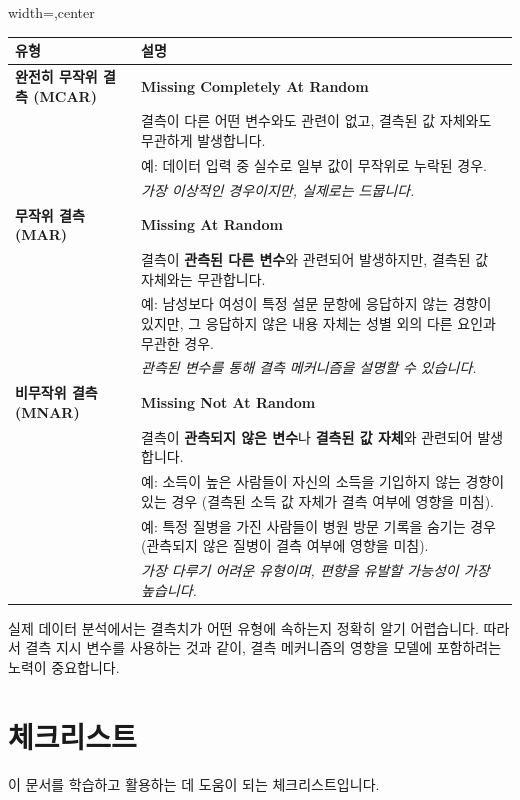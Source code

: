\documentclass[11pt,a4paper]{book}
\providecommand{\newsection}{\section}
\theoremstyle{definition}
\begin{document}
\begin{adjustbox}{width=\textwidth,center}
\begin{tabular}{p{} p{}}
\toprule
\textbf{유형} & \textbf{설명} \\
\midrule
\textbf{완전히 무작위 결측 (MCAR)} & \textbf{Missing Completely At Random} \\
& 결측이 다른 어떤 변수와도 관련이 없고, 결측된 값 자체와도 무관하게 발생합니다. \\
& 예: 데이터 입력 중 실수로 일부 값이 무작위로 누락된 경우. \\
& \textit{가장 이상적인 경우이지만, 실제로는 드뭅니다.} \\
\midrule
\textbf{무작위 결측 (MAR)} & \textbf{Missing At Random} \\
& 결측이 \textbf{관측된 다른 변수}와 관련되어 발생하지만, 결측된 값 자체와는 무관합니다. \\
& 예: 남성보다 여성이 특정 설문 문항에 응답하지 않는 경향이 있지만, 그 응답하지 않은 내용 자체는 성별 외의 다른 요인과 무관한 경우. \\
& \textit{관측된 변수를 통해 결측 메커니즘을 설명할 수 있습니다.} \\
\midrule
\textbf{비무작위 결측 (MNAR)} & \textbf{Missing Not At Random} \\
& 결측이 \textbf{관측되지 않은 변수}나 \textbf{결측된 값 자체}와 관련되어 발생합니다. \\
& 예: 소득이 높은 사람들이 자신의 소득을 기입하지 않는 경향이 있는 경우 (결측된 소득 값 자체가 결측 여부에 영향을 미침). \\
& 예: 특정 질병을 가진 사람들이 병원 방문 기록을 숨기는 경우 (관측되지 않은 질병이 결측 여부에 영향을 미침). \\
& \textit{가장 다루기 어려운 유형이며, 편향을 유발할 가능성이 가장 높습니다.} \\
\bottomrule
\end{tabular}
\end{adjustbox}

\begin{warningbox}[title=결측치 유형의 불확실성]
실제 데이터 분석에서는 결측치가 어떤 유형에 속하는지 정확히 알기 어렵습니다. 따라서 결측 지시 변수를 사용하는 것과 같이, 결측 메커니즘의 영향을 모델에 포함하려는 노력이 중요합니다.
\end{warningbox}

\newsection{체크리스트}

이 문서를 학습하고 활용하는 데 도움이 되는 체크리스트입니다.
\end{document}
